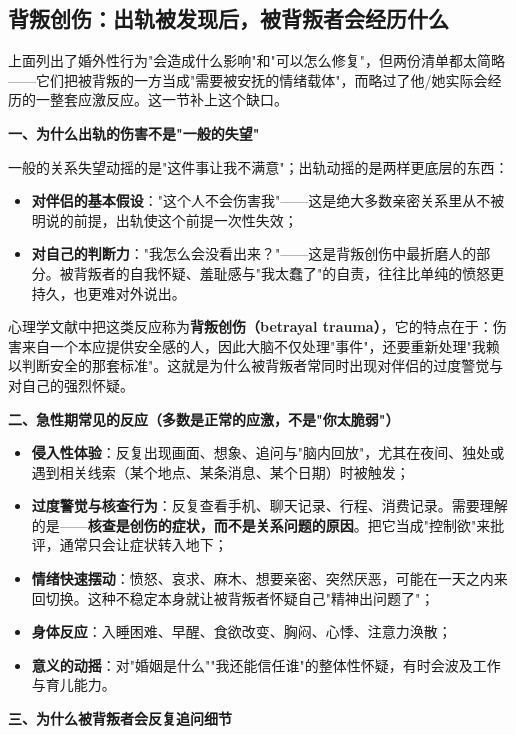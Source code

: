 \subsection{背叛创伤：出轨被发现后，被背叛者会经历什么}

上面列出了婚外性行为"会造成什么影响"和"可以怎么修复"，但两份清单都太简略——它们把被背叛的一方当成"需要被安抚的情绪载体"，而略过了他/她实际会经历的一整套应激反应。这一节补上这个缺口。

\textbf{一、为什么出轨的伤害不是"一般的失望"}

一般的关系失望动摇的是"这件事让我不满意"；出轨动摇的是两样更底层的东西：

\begin{itemize}
\item \textbf{对伴侣的基本假设}："这个人不会伤害我"——这是绝大多数亲密关系里从不被明说的前提，出轨使这个前提一次性失效；
\item \textbf{对自己的判断力}："我怎么会没看出来？"——这是背叛创伤中最折磨人的部分。被背叛者的自我怀疑、羞耻感与"我太蠢了"的自责，往往比单纯的愤怒更持久，也更难对外说出。
\end{itemize}

心理学文献中把这类反应称为\textbf{背叛创伤（betrayal trauma）}，它的特点在于：伤害来自一个本应提供安全感的人，因此大脑不仅处理"事件"，还要重新处理"我赖以判断安全的那套标准"。这就是为什么被背叛者常同时出现对伴侣的过度警觉与对自己的强烈怀疑。

\textbf{二、急性期常见的反应（多数是正常的应激，不是"你太脆弱"）}

\begin{itemize}
\item \textbf{侵入性体验}：反复出现画面、想象、追问与"脑内回放"，尤其在夜间、独处或遇到相关线索（某个地点、某条消息、某个日期）时被触发；
\item \textbf{过度警觉与核查行为}：反复查看手机、聊天记录、行程、消费记录。需要理解的是——\textbf{核查是创伤的症状，而不是关系问题的原因}。把它当成"控制欲"来批评，通常只会让症状转入地下；
\item \textbf{情绪快速摆动}：愤怒、哀求、麻木、想要亲密、突然厌恶，可能在一天之内来回切换。这种不稳定本身就让被背叛者怀疑自己"精神出问题了"；
\item \textbf{身体反应}：入睡困难、早醒、食欲改变、胸闷、心悸、注意力涣散；
\item \textbf{意义的动摇}：对"婚姻是什么""我还能信任谁"的整体性怀疑，有时会波及工作与育儿能力。
\end{itemize}

\textbf{三、为什么被背叛者会反复追问细节}

